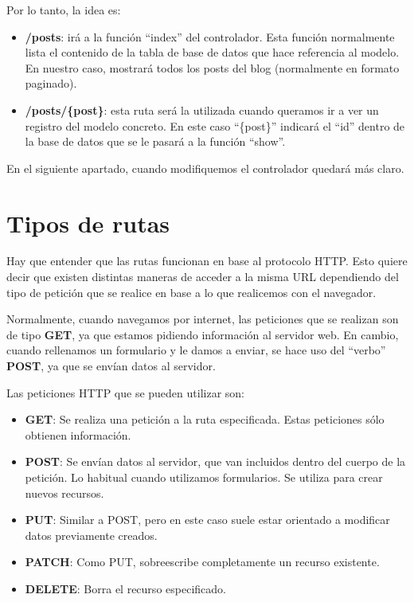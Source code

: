 Por lo tanto, la idea es:

\begin{itemize}
    \item \textbf{/posts}: irá a la función “index” del controlador. Esta función normalmente lista el contenido de la tabla de base de datos que hace referencia al modelo. En nuestro caso, mostrará todos los posts del blog (normalmente en formato paginado).
    \item \textbf{/posts/\{post\}}: esta ruta será la utilizada cuando queramos ir a ver un registro del modelo concreto. En este caso “\{post\}” indicará el “id” dentro de la base de datos que se le pasará a la función “show”.
\end{itemize}

En el siguiente apartado, cuando modifiquemos el controlador quedará más claro.

\section{Tipos de rutas}

Hay que entender que las rutas funcionan en base al protocolo HTTP. Esto quiere decir que existen distintas maneras de acceder a la misma URL dependiendo del tipo de petición que se realice en base a lo que realicemos con el navegador.

Normalmente, cuando navegamos por internet, las peticiones que se realizan son de tipo \textbf{GET}, ya que estamos pidiendo información al servidor web. En cambio, cuando rellenamos un formulario y le damos a enviar, se hace uso del “verbo” \textbf{POST}, ya que se envían datos al servidor.

Las peticiones HTTP que se pueden utilizar son:

\begin{itemize}
    \item \textbf{GET}: Se realiza una petición a la ruta especificada. Estas peticiones sólo obtienen información.
    \item \textbf{POST}: Se envían datos al servidor, que van incluidos dentro del cuerpo de la petición. Lo habitual cuando utilizamos formularios. Se utiliza para crear nuevos recursos.
    \item \textbf{PUT}: Similar a POST, pero en este caso suele estar orientado a modificar datos previamente creados.
    \item \textbf{PATCH}: Como PUT, sobreescribe completamente un recurso existente.
    \item \textbf{DELETE}: Borra el recurso especificado.
\end{itemize}

